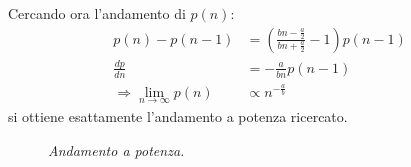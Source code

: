 \documentclass[12pt, a4paper]{book}
\theoremstyle{theorem}
\begin{document}
				Cercando ora l'andamento di $p(n)$:
				\begin{equation}
					\begin{split}
						p(n)-p(n-1)&=\left(\frac{bn-\frac{a}{2}}{bn+\frac{a}{2}}-1\right)p(n-1)\\
						\frac{dp}{dn}&=-\frac{a}{bn}p(n-1)\\
						\Rightarrow\lim_{n\to\infty}p(n)&\propto n^{-\frac{a}{b}}
					\end{split}
				\end{equation}
				si ottiene esattamente l'andamento a potenza ricercato.\\
				\begin{figure}[H]
					\centering
					\caption{\emph{Andamento a potenza.}}
					\label{figure:modello_economico_evoluto}
				\end{figure}
\end{document}
